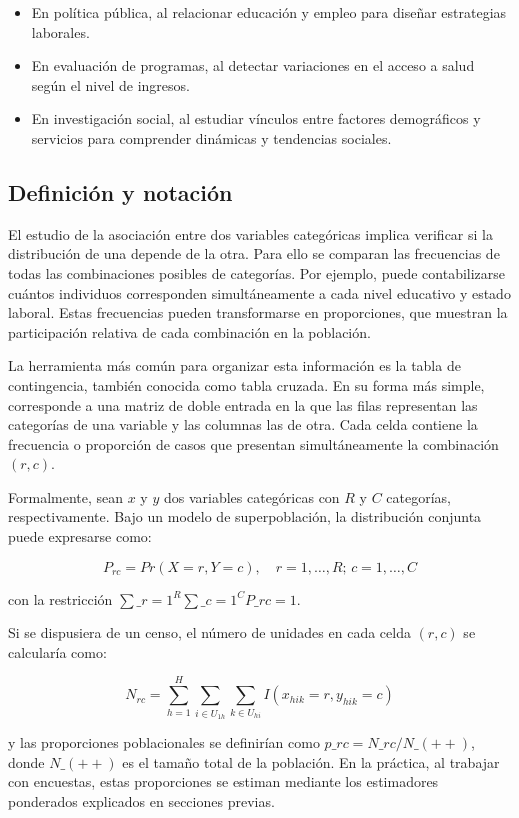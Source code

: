 \documentclass[
  12pt,
]{book}
\providecommand{\tightlist}{%
  \setlength{\itemsep}{0pt}\setlength{\parskip}{0pt}}
\begin{document}
\begin{itemize}
\tightlist
\item
  En política pública, al relacionar educación y empleo para diseñar estrategias laborales.
\item
  En evaluación de programas, al detectar variaciones en el acceso a salud según el nivel de ingresos.
\item
  En investigación social, al estudiar vínculos entre factores demográficos y servicios para comprender dinámicas y tendencias sociales.
\end{itemize}

\subsection{Definición y notación}\label{definiciuxf3n-y-notaciuxf3n}

El estudio de la asociación entre dos variables categóricas implica verificar si la distribución de una depende de la otra. Para ello se comparan las frecuencias de todas las combinaciones posibles de categorías. Por ejemplo, puede contabilizarse cuántos individuos corresponden simultáneamente a cada nivel educativo y estado laboral. Estas frecuencias pueden transformarse en proporciones, que muestran la participación relativa de cada combinación en la población.

La herramienta más común para organizar esta información es la tabla de contingencia, también conocida como tabla cruzada. En su forma más simple, corresponde a una matriz de doble entrada en la que las filas representan las categorías de una variable y las columnas las de otra. Cada celda contiene la frecuencia o proporción de casos que presentan simultáneamente la combinación \((r,c)\).

Formalmente, sean \(x\) y \(y\) dos variables categóricas con \(R\) y \(C\) categorías, respectivamente. Bajo un modelo de superpoblación, la distribución conjunta puede expresarse como:

\[
P_{rc} = Pr(X=r, Y=c), \quad r=1,\dots,R;\, c=1,\dots,C
\tag{9-24}
\]

con la restricción \(\sum\_{r=1}^{R}\sum\_{c=1}^{C} P\_{rc}=1\).

Si se dispusiera de un censo, el número de unidades en cada celda \((r,c)\) se calcularía como:

\[
N_{rc} = \sum_{h=1}^{H} \sum_{i \in U_{1h}} \sum_{k \in U_{hi}} I(x_{hik}=r, y_{hik}=c) 
\tag{9-25}
\]

y las proporciones poblacionales se definirían como \(p\_{rc} = N\_{rc}/N\_{(++)}\), donde \(N\_{(++)}\) es el tamaño total de la población. En la práctica, al trabajar con encuestas, estas proporciones se estiman mediante los estimadores ponderados explicados en secciones previas.
\end{document}
